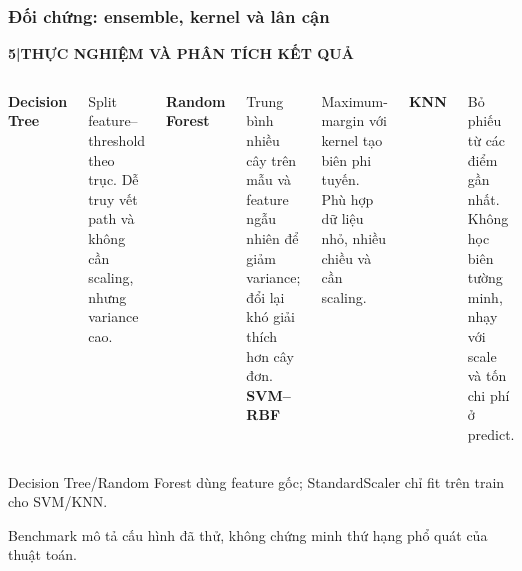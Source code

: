 \documentclass[aspectratio=169,12pt]{beamer}
\newcommand{\chaptertag}[2]{%
  \vspace{-0.16cm}%
  {\scriptsize\bfseries\textcolor{boxframe}{#1\enspace |\enspace #2}}\par
  \vspace{0.12cm}%
}
\begin{document}
\begin{frame}
  \frametitle{Đối chứng: ensemble, kernel và lân cận}
  \chaptertag{5}{THỰC NGHIỆM VÀ PHÂN TÍCH KẾT QUẢ}
  \footnotesize
  \begin{columns}[T,onlytextwidth]
      \textbf{Decision Tree}
      \par Split feature--threshold theo trục. Dễ truy vết path và không cần scaling, nhưng variance cao.
      \par\vspace{0.22cm}
      \textbf{Random Forest}
      \par Trung bình nhiều cây trên mẫu và feature ngẫu nhiên để giảm variance; đổi lại khó giải thích hơn cây đơn.
      \textbf{SVM--RBF}
      \par Maximum-margin với kernel tạo biên phi tuyến. Phù hợp dữ liệu nhỏ, nhiều chiều và cần scaling.
      \par\vspace{0.22cm}
      \textbf{KNN}
      \par Bỏ phiếu từ các điểm gần nhất. Không học biên tường minh, nhạy với scale và tốn chi phí ở predict.
  \end{columns}
  \vspace{0.20cm}
  \begin{tcolorbox}[focusbox,width=0.92\textwidth,top=1mm,bottom=1mm]
    \centering
    Decision Tree/Random Forest dùng feature gốc; StandardScaler chỉ fit trên train cho SVM/KNN.
  \end{tcolorbox}
  \vspace{0.10cm}
  \centering
  Benchmark mô tả cấu hình đã thử, không chứng minh thứ hạng phổ quát của thuật toán.
\end{frame}
\end{document}
